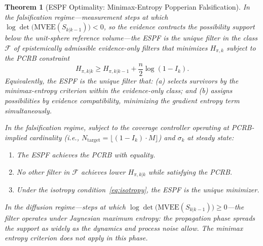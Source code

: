 \documentclass[12pt]{article}
\newtheorem{theorem}{Theorem}[section]
\begin{document}
\begin{theorem}[ESPF Optimality: Minimax-Entropy Popperian Falsification]
In the falsification regime---measurement steps at which $\log\det\bigl(\mathrm{MVEE}(S_{k|k-1})\bigr) < 0$, so the evidence contracts the possibility support below the unit-sphere reference volume---the ESPF is the unique filter in the class $\mathcal{F}$ of epistemically admissible evidence-only filters that minimizes $H_{\pi,k}$ subject to the PCRB constraint
\begin{equation}
H_{\pi,k|k} \geq H_{\pi,k|k-1} + \frac{n}{2}\log(1 - I_k).
\end{equation}
Equivalently, the ESPF is the unique filter that: (a) selects survivors by the minimax-entropy criterion within the evidence-only class; and (b) assigns possibilities by evidence compatibility, minimizing the gradient entropy term simultaneously.

In the falsification regime, subject to the coverage controller operating at PCRB-implied cardinality (i.e., $N_{\mathrm{target}} = \lfloor(1-I_k)\cdot M\rfloor$) and $\sigma_k$ at steady state:
\begin{enumerate}
\item[(i)] The ESPF achieves the PCRB with equality.
\item[(ii)] No other filter in $\mathcal{F}$ achieves lower $H_{\pi,k|k}$ while satisfying the PCRB.
\item[(iii)] Under the isotropy condition~\eqref{eq:isotropy}, the ESPF is the unique minimizer.
\end{enumerate}

In the diffusion regime---steps at which $\log\det\bigl(\mathrm{MVEE}(S_{k|k-1})\bigr) \geq 0$---the filter operates under Jaynesian maximum entropy: the propagation phase spreads the support as widely as the dynamics and process noise allow. The minimax entropy criterion does not apply in this phase.
\end{theorem}
\end{document}

